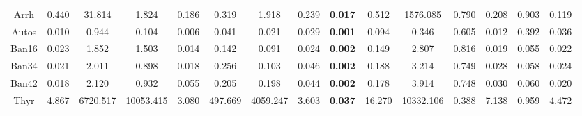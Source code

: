 \documentclass[times, review, 10pt]{elsarticle}
\begin{document}
\begin{table}[!htb]
{\begin{tabular}{@{}ccccccccccccccc@{}}
{ Arrh}    & { 0.440}                     & { 31.814}                      & { 1.824}                       & { 0.186}                     & { 0.319}                      & { 1.918}                       & { 0.239}                     & { \textbf{0.017}}                     & { 0.512}                     & { 1576.085}                     & { 0.790}                     & { 0.208}                     & { 0.903}                     & { 0.119}        \\
{ Autos}   & { 0.010}                     & { 0.944}                       & { 0.104}                       & { 0.006}                     & { 0.041}                      & { 0.021}                       & { 0.029}                     & { \textbf{0.001}}                     & { 0.094}                     & { 0.346}                        & { 0.605}                     & { 0.012}                     & { 0.392}                     & { 0.036}        \\
{ Ban16}   & { 0.023}                     & { 1.852}                       & { 1.503}                       & { 0.014}                     & { 0.142}                      & { 0.091}                       & { 0.024}                     & { \textbf{0.002}}                     & { 0.149}                     & { 2.807}                        & { 0.816}                     & { 0.019}                     & { 0.055}                     & { 0.022}        \\
{ Ban34}   & { 0.021}                     & { 2.011}                       & { 0.898}                       & { 0.018}                     & { 0.256}                      & { 0.103}                       & { 0.046}                     & { \textbf{0.002}}                     & { 0.188}                     & { 3.214}                        & { 0.749}                     & { 0.028}                     & { 0.058}                     & { 0.024}        \\
{ Ban42}   & { 0.018}                     & { 2.120}                       & { 0.932}                       & { 0.055}                     & { 0.205}                      & { 0.198}                       & { 0.044}                     & { \textbf{0.002}}                     & { 0.178}                     & { 3.914}                        & { 0.748}                     & { 0.030}                     & { 0.060}                     & { 0.020}        \\
{ Thyr}    & { 4.867}                     & { 6720.517}                    & { 10053.415}                   & { 3.080}                     & { 497.669}                    & { 4059.247}                    & { 3.603}                     & { \textbf{0.037}}                     & { 16.270}                    & { 10332.106}                    & { 0.388}                     & { 7.138}                     & { 0.959}                     & { 4.472}        \\ \midrule

\end{tabular}}
\end{table}
\end{document}
